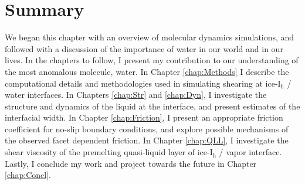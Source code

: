 \section{Summary}
We began this chapter with an overview of molecular dynamics
simulations, and followed with a discussion of the importance of water
in our world and in our lives.  In the chapters to follow, I present
my contribution to our understanding of the most anomalous molecule,
water. In Chapter \ref{chap:Methods} I describe the computational
details and methodologies used in simulating shearing at
ice-I$_\mathrm{h}$ / water interfaces. In Chapters \ref{chap:Str} and
\ref{chap:Dyn}, I investigate the structure and dynamics of the liquid
at the interface, and present estimates of the interfacial width. In
Chapter \ref{chap:Friction}, I present an appropriate friction
coefficient for no-slip boundary conditions, and explore possible
mechanisms of the observed facet dependent friction. In Chapter
\ref{chap:QLL}, I investigate the shear viscosity of the premelting
quasi-liquid layer of ice-I$_\mathrm{h}$ / vapor interface. Lastly, I
conclude my work and project towards the future in Chapter
\ref{chap:Concl}.









